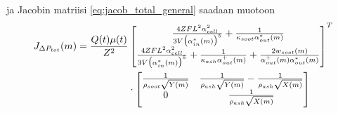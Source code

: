 ja Jacobin matriisi \eqref{eq:jacob_total_general} saadaan muotoon
\begin{align}
\begin{split}
    J_{\Delta P_{tot}}(m) =
    \frac{Q(t)\mu(t)}{Z^2} 
    &
    \begin{bmatrix} 
        \frac{4 ZF L^2  \alpha_{cell}^2}{3 V\bigl(\alpha_{in}^*(m)\bigr)^5}
        +
        \frac{1}{\kappa_{soot}\alpha_{out}^*(m)}
        \\
        \frac{4 Z F L^2 \alpha_{cell}^2}{3 V\bigl(\alpha_{in}^*(m)\bigr)^5}
        +
        \frac{1}{\kappa_{ash} \alpha_{out}^{+}(m)}
        +
        \frac{2 w_{soot}(m)}{\alpha_{out}^{+}(m)\alpha_{out}^*(m)}
         \end{bmatrix}^T
    \\ & \cdot
    \begin{bmatrix} 
        \frac{1}{\rho_{soot}\sqrt{Y(m)}}
        &
        \frac{1}{\rho_{ash} \sqrt{Y(m)}}-\frac{1}{\rho_{ash} \sqrt{X(m)}} 
        \\
        0 
        &
        \frac{1}{\rho_{ash} \sqrt{X(m)}} 
         \end{bmatrix}
\end{split}
\end{align}